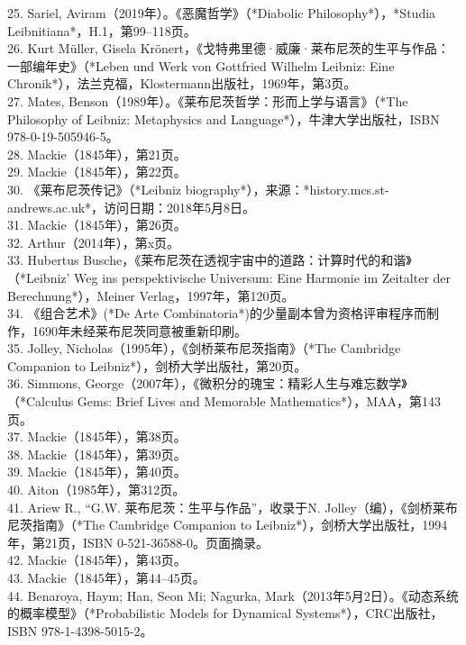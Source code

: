 25. Sariel, Aviram（2019年）。《恶魔哲学》（*Diabolic Philosophy*），*Studia Leibnitiana*，H.1，第99–118页。\\
26. Kurt Müller, Gisela Krönert，《戈特弗里德·威廉·莱布尼茨的生平与作品：一部编年史》（*Leben und Werk von Gottfried Wilhelm Leibniz: Eine Chronik*），法兰克福，Klostermann出版社，1969年，第3页。\\
27. Mates, Benson（1989年）。《莱布尼茨哲学：形而上学与语言》（*The Philosophy of Leibniz: Metaphysics and Language*），牛津大学出版社，ISBN 978-0-19-505946-5。\\  
28. Mackie（1845年），第21页。\\ 
29. Mackie（1845年），第22页。\\  
30. 《莱布尼茨传记》（*Leibniz biography*），来源：*history.mcs.st-andrews.ac.uk*，访问日期：2018年5月8日。\\  
31. Mackie（1845年），第26页。\\ 
32. Arthur（2014年），第x页。\\ 
33. Hubertus Busche，《莱布尼茨在透视宇宙中的道路：计算时代的和谐》（*Leibniz' Weg ins perspektivische Universum: Eine Harmonie im Zeitalter der Berechnung*），Meiner Verlag，1997年，第120页。\\
34. 《组合艺术》(*De Arte Combinatoria*)的少量副本曾为资格评审程序而制作，1690年未经莱布尼茨同意被重新印刷。\\
35. Jolley, Nicholas（1995年），《剑桥莱布尼茨指南》（*The Cambridge Companion to Leibniz*），剑桥大学出版社，第20页。\\
36. Simmons, George（2007年），《微积分的瑰宝：精彩人生与难忘数学》（*Calculus Gems: Brief Lives and Memorable Mathematics*），MAA，第143页。\\
37. Mackie（1845年），第38页。\\
38. Mackie（1845年），第39页。\\
39. Mackie（1845年），第40页。\\
40. Aiton（1985年），第312页。\\
41. Ariew R., “G.W. 莱布尼茨：生平与作品”，收录于N. Jolley（编），《剑桥莱布尼茨指南》（*The Cambridge Companion to Leibniz*），剑桥大学出版社，1994年，第21页，ISBN 0-521-36588-0。页面摘录。\\
42. Mackie（1845年），第43页。\\
43. Mackie（1845年），第44–45页。\\
44. Benaroya, Haym; Han, Seon Mi; Nagurka, Mark（2013年5月2日）。《动态系统的概率模型》（*Probabilistic Models for Dynamical Systems*），CRC出版社，ISBN 978-1-4398-5015-2。\\  
